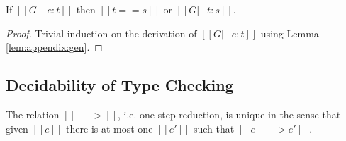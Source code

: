 \begin{lem}\label{lem:appendix:corrtyp}
    If $[[G |- e:t]]$ then $[[t == s]]$ or $[[G |- t : s]]$.
\end{lem}

\begin{proof}
    Trivial induction on the derivation of $[[G |- e:t]]$ using Lemma \ref{lem:appendix:gen}.
\end{proof}

\subsection{Decidability of Type Checking}
\begin{lem}\label{lem:appendix:unired}
	The relation $[[-->]]$, i.e. one-step reduction, is unique in the sense that given $[[e]]$ there is at most one $[[e']]$ such that $[[e --> e']]$.
\end{lem}

